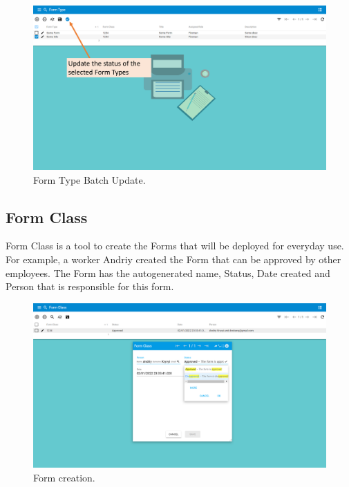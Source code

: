 \begin{figure}[!htbp]
\centering
\includegraphics[width=0.95\linewidth]{sections/forms/images/form_type-batch_update.png}
\caption{Form Type Batch Update.}\label{sections/forms/images/form_type-batch_update}
\end{figure}


\newpage

\subsection{Form Class}
Form Class is a tool to create the Forms that will be deployed for everyday use. For example, a worker Andriy created the Form that can be approved by other employees. The Form has the autogenerated name, Status, Date created and Person that is responsible for this form.

\begin{figure}[!htbp]
\centering
\includegraphics[width=0.95\linewidth]{sections/forms/images/form_class_master.png}
\caption{Form creation.}\label{sections/forms/images/form_class_master}
\end{figure}

